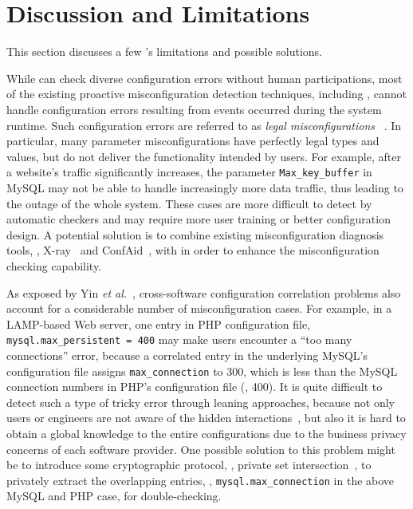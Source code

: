 
\section{Discussion and Limitations}

This section discusses a few \app's limitations
and possible solutions.

While \app can check diverse configuration errors without
human participations, most of the existing proactive 
misconfiguration detection techniques,
including \app, cannot handle configuration errors
resulting from events occurred during the system runtime.
Such configuration errors are referred to as {\em legal misconfigurations}%
~\cite{yin11anempirical}. In particular, 
many parameter misconfigurations have 
perfectly legal types and values, 
but do not deliver the functionality intended by users. 
For example, after a website's traffic significantly increases,
the parameter {\tt Max\_key\_buffer} in MySQL may not 
be able to handle increasingly more data traffic,
thus leading to the outage of the whole system.
These cases are more difficult to detect by
automatic checkers and may require more user training or
better configuration design.
A potential solution is to combine existing misconfiguration diagnosis
tools, \eg, X-ray~\cite{attariyan12x-ray} 
and ConfAid~\cite{attariyan10automating},
with \app in order to enhance the 
misconfiguration checking capability.

As exposed by Yin {\em et al.}~\cite{yin11anempirical},
cross-software configuration correlation problems also account
for a considerable number of misconfiguration cases.
For example, in a LAMP-based Web server, one entry in 
PHP configuration file, {\tt mysql.max\_persistent = 400}
may make users encounter a ``too many connections'' error,
because a correlated entry in the underlying MySQL's configuration
file assigns {\tt max\_connection} to 300, which is less
than the MySQL connection numbers in PHP's configuration file (\ie, 400).
It is quite difficult to detect such a type of tricky error
through leaning approaches, because not only users or engineers 
are not aware of the hidden interactions~\cite{xu15systems},
but also it is hard to obtain a global knowledge to the entire
configurations due to the business privacy concerns of
each software provider.
One possible solution to this problem might be to introduce
some cryptographic protocol, \eg, private set
intersection~\cite{kissner05privacy}, to privately extract the
overlapping entries, \eg, {\tt mysql.max\_connection} in the 
above MySQL and PHP case, for double-checking.

